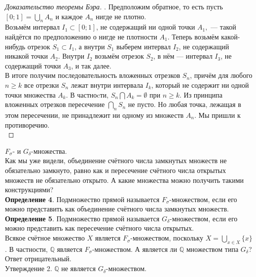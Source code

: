 \documentclass{report}
\begin{document}
\begin{proof}[Доказательство теоремы Бэра]. Предположим обратное, то есть пусть $[0;1] = \bigcup_n A_n$ и каждое $A_n$ нигде не плотно. \\

Возьмём интервал $I_1 \subset [0;1]$, не содержащий ни одной точки $A_1,$ — такой найдётся по предположению о нигде не плотности $A_1$. Теперь возьмём какой-нибудь отрезок $S_1 \subset I_1$, а внутри $S_1$ выберем интервал $I_2$, не содержащий никакой точки $A_2$. Внутри $I_2$ возьмём отрезок $S_2$, в нём — интервал $I_3$, не содержащий точки $A_3$, и так далее. \\

В итоге получим последовательность вложенных отрезков $S_n$, причём для любого $n \geq k$ все отрезки $S_n$ лежат внутри интервала $I_k$, который не содержит ни одной точки множества $A_k$. В частноcти, $S_n \bigcap A_k = \emptyset$ при $n \geq k$. Из принципа вложенных отрезков пересечение $\bigcap_n S_n$ не пусто. Но любая точка, лежащая в этом пересечении, не принадлежит ни одному из множеств $A_n$. Мы пришли к противоречию.\\
\end{proof}

$F_{\sigma}$- и $G_{\delta}$-множества. \\
Как мы уже видели, объединение счётного числа замкнутых множеств не обязательно замкнуто, равно как и пересечение счётного числа открытых множеств не обязательно открыто. А какие множества можно получить такими конструкциями? \\

\textbf{Определение 4}. Подмножество прямой называется $F_{\sigma}$-множеством, если его можно представить как объединение счётного числа замкнутых множеств. \\

\textbf{Определение 5}. Подмножество прямой называется $G_{\delta}$-множеством, если его можно представить как пересечение счётного числа открытых. \\

Всякое счётное множество $X$ является $F_{\sigma}$-множеством, поскольку $X = \bigcup_{x \in X} \{x\}$. В частности, $\mathbb{Q}$ является $F_{\sigma}$-множеством. А является ли $\mathbb{Q}$ множеством типа $G_{\delta}$? \\

Ответ отрицательный. \\

Утверждение 2. $\mathbb{Q}$ не является $G_{\delta}$-множеством.\\
\end{document}
